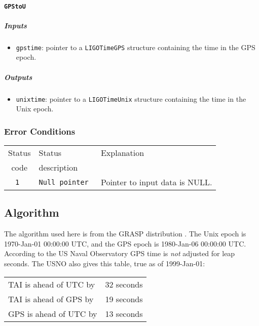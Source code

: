 \paragraph{\texttt{GPStoU}}

\subparagraph{Inputs}

\begin{itemize}
  \item \texttt{gpstime}: pointer to a \texttt{LIGOTimeGPS} structure containing
    the time in the GPS epoch.
\end{itemize}

\subparagraph{Outputs}

\begin{itemize}
  \item \texttt{unixtime}: pointer to a \texttt{LIGOTimeUnix} structure
    containing the time in the Unix epoch.
\end{itemize}


\subsubsection{Error Conditions}
\begin{tabular}{|c|l|l|}
  \hline
  Status & Status       & Explanation \\
  code   & description  &             \\
  \hline
  \tt 1  & \tt Null pointer & Pointer to input data is NULL. \\
  \hline
\end{tabular}


\subsection{Algorithm}

The algorithm used here is from the GRASP distribution \cite{grasp:194}.
The Unix epoch is 1970-Jan-01 00:00:00 UTC, and the GPS epoch is 1980-Jan-06
00:00:00 UTC.  According to the US Naval Observatory GPS time is {\em not}
adjusted for leap seconds.  The USNO also gives this table, true as of
1999-Jan-01:

\begin{center}
  \begin{tabular}{|l|l|}
    \hline 
    TAI is ahead of UTC by & 32 seconds \\
    TAI is ahead of GPS by & 19 seconds \\
    GPS is ahead of UTC by & 13 seconds \\
    \hline
  \end{tabular}
\end{center}

